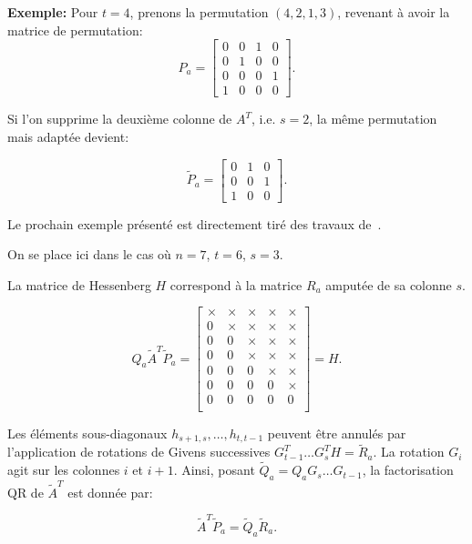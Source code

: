 \textbf{Exemple:} Pour $t=4$, prenons la permutation $(4,2,1,3)$, revenant à avoir la matrice de permutation:
 \[P_a = \begin{bmatrix}
     0 & 0 & 1 & 0 \\
     0 & 1 & 0 & 0 \\
     0 & 0 & 0 & 1 \\
     1 & 0 & 0 & 0
 \end{bmatrix}.\]

 Si l'on supprime la deuxième colonne de $A^T$, i.e. $s=2$, la même permutation mais adaptée devient:

 \[\tilde P_a = \begin{bmatrix}
     0 & 1 & 0\\
     0 & 0 & 1\\
     1 & 0 & 0
 \end{bmatrix}.\]

Le prochain exemple présenté est directement tiré des travaux de~\cite{goluvanl13}.

On se place ici dans le cas où $n=7$, $t=6$, $s=3$.


La matrice de Hessenberg $H$ correspond à la matrice $R_a$ amputée de sa colonne $s$. 

\begin{equation*}
    Q_a\tilde A^T\tilde P_a =
    \begin{bmatrix}
        \times & \times& \times & \times &\times \\
        0 & \times& \times& \times &\times \\
        0 & 0& \times& \times &\times \\
        0 & 0& \times& \times &\times \\
        0 & 0& 0& \times &\times \\
        0 & 0& 0& 0 &\times \\
        0 & 0& 0& 0 &0 \\
    \end{bmatrix} = H.
\end{equation*}

Les éléments sous-diagonaux $h_{s+1,s},\ldots, h_{t,t-1}$ peuvent être annulés
par l'application de rotations de Givens successives $G_{t-1}^T\ldots G_s^TH = \tilde R_a$. La rotation $G_i$ agit sur les colonnes $i$ et $i+1$. Ainsi, 
posant $\tilde Q_a = Q_a G_s\ldots G_{t-1}$, la factorisation QR de $\tilde A^T$ est donnée par:

\begin{equation}
    \tilde A^T\tilde P_a = \tilde Q_a \tilde R_a.
\end{equation}

